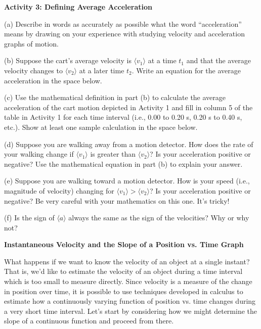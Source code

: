 \textbf{Activity 3: Defining Average Acceleration }

(a) Describe in words as accurately as possible what the word ``acceleration''
means by drawing on your experience with studying velocity and acceleration
graphs of motion.
\vspace{20mm}

(b) Suppose the cart's average velocity is $\langle v_{1}\rangle$
at a time \( t_{1} \)
and that the average velocity changes to $\langle v_2\rangle$
at a later time \( t_{2} \).
Write an equation for the average acceleration in the space below. 
\vspace{20mm}

(c) Use the mathematical definition in part (b) to calculate the average acceleration
of the cart motion depicted in Activity 1 and fill in column 5 of the table
in Activity 1 for each time interval (i.e., 0.00 to 0.20 s, 0.20 s to 0.40 s,
etc.). Show at least one sample calculation in the space below.
\vspace{20mm}

(d) Suppose you are walking away from a motion detector. How does the rate of
your walking change if $\langle v_{1}\rangle$ is greater than 
$\langle v_{2}\rangle$? Is your
acceleration positive or negative? Use the mathematical equation in part (b)
to explain your answer. 
\vspace{20mm}

(e) Suppose you are walking toward a motion detector. How is your speed (i.e.,
magnitude of velocity) changing for 
$\langle v_{1}\rangle > \langle v_{2} \rangle$? Is your
acceleration positive or negative? Be very careful with your mathematics on
this one. It's tricky!
\vspace{20mm}

(f) Is the sign of $\langle a\rangle$
always the same as the sign of the velocities? Why or
why not?
\vspace{20mm}

\textbf{Instantaneous Velocity and the Slope of a Position vs. Time Graph} 

What happens if we want to know the velocity of an object at a single instant?
That is, we'd like to estimate the velocity of an object during a time interval
which is too small to measure directly. Since velocity is a measure of the change
in position over time, it is possible to use techniques developed in calculus
to estimate how a continuously varying function of position vs. time changes
during a very short time interval. Let's start by considering how we might determine
the slope of a continuous function and proceed from there.

